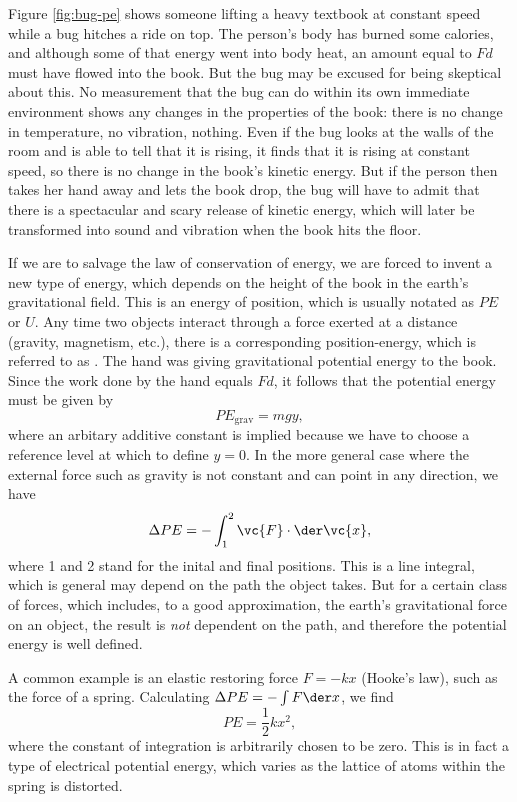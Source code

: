 

Figure \ref{fig:bug-pe} shows someone lifting a heavy textbook at constant speed while a bug hitches
a ride on top. The person's body has burned some calories, and although some of
that energy went into body heat, an amount equal to $Fd$ must have flowed into the
book. But the bug may be excused for being skeptical about this. No measurement that
the bug can do within its own immediate environment shows any changes in the properties
of the book: there is no change in temperature, no vibration, nothing.
Even if the bug looks at the walls of the room and is able to tell that it is rising,
it finds that it is rising at constant speed, so there is no change in the book's kinetic
energy. But if the person then takes her hand away and lets the book drop, the bug
will have to admit that there is a spectacular and scary release of kinetic energy,
which will later be transformed into sound and vibration when the book hits the floor.

If we are to salvage the law of conservation of energy, we are forced to invent a new
type of energy, which depends on the height of the book in the earth's gravitational
field. This is an energy of position, which is usually notated as $PE$ or $U$.
Any time two objects interact through a force exerted at a distance (gravity, magnetism,
etc.), there is a corresponding position-energy, which is referred to as .
The hand was giving gravitational potential energy to the book. Since the work done by the
hand equals $Fd$, it follows that the potential energy must be given by
\begin{equation}
  PE_\text{grav} = mgy,
\end{equation}
where an arbitary additive constant is implied because we have to choose a reference level
at which to define $y=0$. In the more general case where the external force such as gravity
is not constant and can point in any direction, we have
\begin{equation}
  \Delta PE = -\int_1^2 \vc{F}\cdot\der\vc{x},
\end{equation}
where 1 and 2 stand for the inital and final positions. This is a line integral, which is general
may depend on the path the object takes. But for a certain class of forces, which includes, to a
good approximation, the earth's gravitational force on an object, the result is \emph{not}
dependent on the path, and therefore the potential energy is well defined.

A common example is an elastic restoring force $F=-kx$ (Hooke's law), such as the force of
a spring. Calculating $\Delta PE=-\int F \der x$, we find
\begin{equation}
  PE = \frac{1}{2}kx^2,
\end{equation}
where the constant of integration is arbitrarily chosen to be zero. This is in fact a type
of electrical potential energy, which varies as the lattice of atoms within the spring is
distorted.
